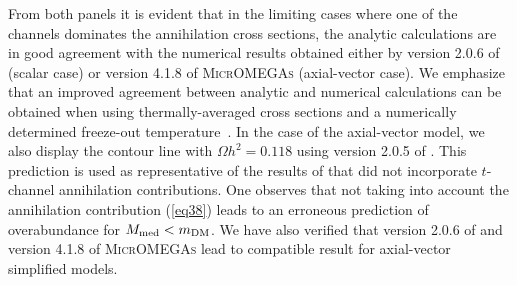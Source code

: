 From both panels it is evident that in the limiting cases where one of the channels dominates the annihilation cross sections, the analytic calculations are in good agreement with the numerical results obtained either by version 2.0.6 of \maddm (scalar case) or version 4.1.8 of \textsc{MicrOMEGAs} (axial-vector case). We emphasize that an improved agreement between analytic and numerical calculations can be obtained when using thermally-averaged cross sections and a numerically determined freeze-out temperature~\cite{Gondolo:1990dk}. In the case of the axial-vector model, we also display the contour line with $\Omega h^2 = 0.118$ using version 2.0.5 of \maddm. This prediction is used as representative of the results of \cite{Pree:2016hwc} that did not incorporate $t$-channel annihilation contributions. One observes that not taking into account the annihilation  contribution (\ref{eq38}) leads to an erroneous prediction of overabundance for $M_{\rm med} < m_{\rm DM}$. We have also verified that version 2.0.6 of \maddm and version 4.1.8 of \textsc{MicrOMEGAs} lead to compatible result for axial-vector simplified models. 






